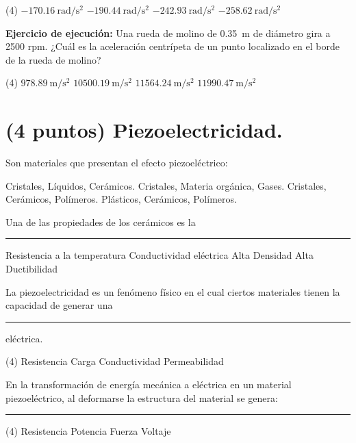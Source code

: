 \documentclass[12pt, letter]{exam}
\begin{document}
\begin{questions}
    \begin{tasks}(4)
        \task $\displaystyle - \SI{170.16}{\radian\per\square\second}$
        \task $\displaystyle - \SI{190.44}{\radian\per\square\second}$
        \task $\displaystyle - \SI{242.93}{\radian\per\square\second}$
        \task $\displaystyle - \SI{258.62}{\radian\per\square\second}$
    \end{tasks}
    \question \label{Ejercicio_03} \textbf{Ejercicio de ejecución: } Una rueda de molino de \SI{0.35}{\meter} de diámetro gira a \num{2500} rpm. ¿Cuál es la aceleración centrípeta de un punto localizado en el borde de la rueda de molino?
    \begin{tasks}(4)
        \task $\displaystyle \SI[per-mode=fraction]{978.89}{\meter\per\square\second}$
        \task $\displaystyle \SI[per-mode=fraction]{10500.19}{\meter\per\square\second}$
        \task $\displaystyle \SI[per-mode=fraction]{11564.24}{\meter\per\square\second}$
        \task $\displaystyle \SI[per-mode=fraction]{11990.47}{\meter\per\square\second}$
    \end{tasks}
    
    \section{(4 puntos) Piezoelectricidad.}

    \question Son materiales que presentan el efecto piezoeléctrico:
    \begin{multicols}{2}
    \begin{tasks}
        \task Cristales, Líquidos, Cerámicos.
        \task Cristales, Materia orgánica, Gases.
        \task Cristales, Cerámicos, Polímeros.
        \task Plásticos, Cerámicos, Polímeros.
    \end{tasks}
\end{multicols}
    \question Una de las propiedades de los cerámicos es la \rule{2cm}{0.1mm}

    \vspace{0.5cm}
    \begin{multicols}{2}
        \begin{tasks}
            \task Resistencia a la temperatura
            \task Conductividad eléctrica
            \task Alta Densidad
            \task Alta Ductibilidad
        \end{tasks}
    \end{multicols}
    \question La piezoelectricidad es un fenómeno físico en el cual ciertos materiales tienen la capacidad de generar una \rule{2cm}{0.1mm} eléctrica.
    \begin{tasks}(4)
        \task Resistencia
        \task Carga
        \task Conductividad
        \task Permeabilidad
    \end{tasks}
    \question En la transformación de energía mecánica a eléctrica en un material piezoeléctrico, al deformarse la estructura del material se genera: \rule{2cm}{0.1mm}
    \begin{tasks}(4)
        \task Resistencia
        \task Potencia
        \task Fuerza
        \task Voltaje
    \end{tasks}


\end{questions}
\end{document}
